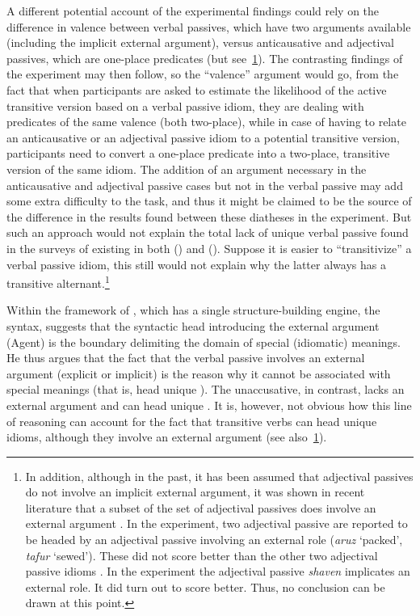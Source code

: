 \documentclass[output=paper]{langsci/langscibook}
\begin{document}
A different potential account of the experimental findings could rely on the
difference in valence between verbal passives, which have two arguments
available (including the implicit external argument), versus anticausative and
adjectival passives, which are one-place predicates (but see~\cref{fn:20.16}). The
contrasting findings of the experiment may then follow, so the ``valence''
argument would go, from the fact that when participants are asked to estimate
the likelihood of the active transitive version based on a verbal passive
idiom, they are dealing with predicates of the same valence (both two-place),
while in case of having to relate an anticausative or an adjectival passive
idiom to a potential transitive version, participants need to convert a
one-place predicate into a two-place, transitive version of the same idiom. The
addition of an argument necessary in the anticausative and adjectival passive
cases but not in the verbal passive may add some extra difficulty to the task,
and thus it might be claimed to be the source of the difference in the results
found between these diatheses in the experiment. But such an approach would not
explain the total lack of unique verbal passive  found in the surveys of
existing  in both  () and 
(\citealt{HorSil2009}). Suppose it is easier to “transitivize” a verbal passive
idiom, this still would not explain why the latter always has a transitive
alternant.\footnote{In addition, although in the past, it has been assumed that
    adjectival passives do not involve an implicit external argument, it was
    shown in recent literature that a subset of the set of adjectival passives
    does involve an external argument
    \parencite{Anagnostopoulou2003,GehMar2014,McIntyre2013,Meltzer-Asscher2011}.
    In the  experiment, two adjectival passive  are reported
    to be headed by an adjectival passive involving an external role
    (\emph{aruz} ‘packed’, \emph{tafur} ‘sewed’). These  did not
        score better than the other two adjectival passive idioms
        \parencite{SilHorKluWex2018}. In the  experiment the adjectival
passive \emph{shaven} implicates an external role. It did turn out to score
better. Thus, no conclusion can be drawn at this point.\label{fn:20.16}}

Within the framework of , which has a single
structure-building engine, the syntax, \citet{Marantz1997} suggests that the
syntactic head introducing the external argument (Agent) is the boundary
delimiting the domain of special (idiomatic) meanings. He thus argues that the
fact that the verbal passive involves an external argument (explicit or
implicit) is the reason why it cannot be associated with special meanings (that
is, head unique ). The unaccusative, in
contrast, lacks an external argument and can head unique . It is,
however, not obvious how this line of reasoning can account for the fact that
transitive verbs can head unique idioms, although they involve an external
argument (see also~\cref{fn:20.16}).\largerpage[2]
\end{document}
